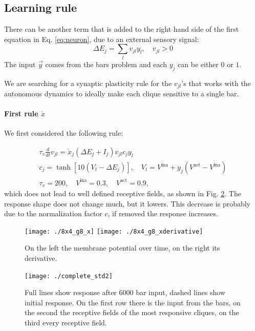 \documentclass[10pt,a4paper]{article}
\begin{document}
		\subsection{Learning rule}
		There can be another term that is added to the right hand side of the first equation in Eq. \ref{eq:neuron}, due to an external sensory signal:
		\begin{equation}
				\Delta E_j = \sum_l v_{jl} y_l, \quad v_{jl} > 0
		\end{equation}
		The input $\vec{y}$ comes from the bars problem and each $y_j$ can be either $0$ or $1$. 
		
		We are searching for a synaptic plasticity rule for the $v_{jl}$'s that works with the autonomous dynamics to ideally make each clique sensitive to a single bar.
		
		\paragraph{First rule $\dot{x}$}
		We first considered the following rule:

		\begin{gather}
		\tau_v \frac{d}{dt} v_{jl} = \dot{x}_j \left(\Delta E_j + I_j\right) v_{jl} c_j y_l\\
		c_j = \tanh{\left[10 \left(V_t - \Delta E_j \right)\right]}, \quad V_t = V^{\text{ina}} + y_j \left(V^{\text{act}} - V^{\text{ina}}\right) \\ 
		\tau_v = 200, \quad V^{\text{ina}} = 0.3, \quad V^{\text{act}} = 0.9,
		\end{gather}
		which does not lead to well defined receptive fields, as shown in Fig. \ref{fig:std_complete}. The response shape does not change much, but it lowers. This decrease is probably due to the normalization factor $c$, if removed the response increases.
		
		\begin{figure}[t]
			\centering
			\texttt{[image: ./8x4\_g8\_x]}
			\texttt{[image: ./8x4\_g8\_xderivative]}
			\label{fig:membrane_potential}
			\caption{On the left the membrane potential over time, on the right its derivative.}
		\end{figure}	
			
		\begin{figure}
			\centering
			\texttt{[image: ./complete\_std2]}
			\caption{Full lines show response after 6000 bar input, dashed lines show initial response. On the first row there is the input from the bars, on the second the receptive fields of the most responsive cliques, on the third every receptive field.}
			\label{fig:std_complete}
		\end{figure}
				
\end{document}
